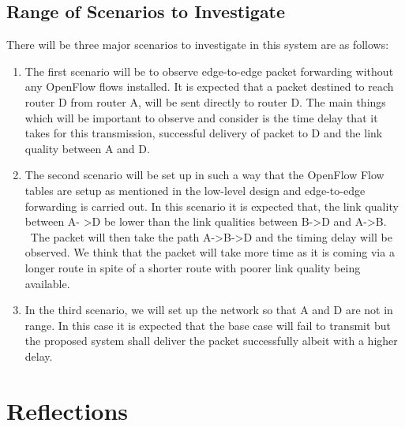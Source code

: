 \documentclass{article}
\begin{document}
\subsection{Range of Scenarios to Investigate}
There will be three major scenarios to investigate in this system are as follows:
\begin{enumerate}
\item The first scenario will be to observe edge-to-edge packet forwarding without any OpenFlow flows installed. It is
expected that a packet destined to reach router D from router A, will be sent directly to router D. The main things
which will be important to observe and consider is the time delay that it takes for this transmission, successful
delivery of packet to D and the link quality between A and D. 
\item The second scenario will be set up in such a way that the OpenFlow Flow tables are setup as mentioned in the
low-level design and edge-to-edge forwarding is carried out. In this scenario it is expected that, the link quality
between A- \textgreater D be lower than the link qualities between B-\textgreater D and A-\textgreater B.  The packet
will then take the path A-\textgreater B-\textgreater D and the
timing delay will be observed. We think that the packet will take more time as it is coming via a longer route in spite
of a shorter route with poorer link quality being available.
\item In the third scenario, we will set up the network so that A and D are not in range. In this case it is expected
that the base case will fail to transmit but the proposed system shall deliver the packet successfully albeit with a
higher delay.  
\end{enumerate}
\section{Reflections}
\end{document}
